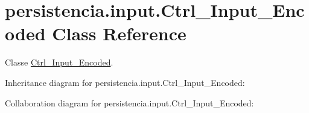 \hypertarget{classpersistencia_1_1input_1_1Ctrl__Input__Encoded}{}\section{persistencia.\+input.\+Ctrl\+\_\+\+Input\+\_\+\+Encoded Class Reference}
\label{classpersistencia_1_1input_1_1Ctrl__Input__Encoded}


Classe \hyperlink{classpersistencia_1_1input_1_1Ctrl__Input__Encoded}{Ctrl\+\_\+\+Input\+\_\+\+Encoded}.  




Inheritance diagram for persistencia.\+input.\+Ctrl\+\_\+\+Input\+\_\+\+Encoded\+:


Collaboration diagram for persistencia.\+input.\+Ctrl\+\_\+\+Input\+\_\+\+Encoded\+:

